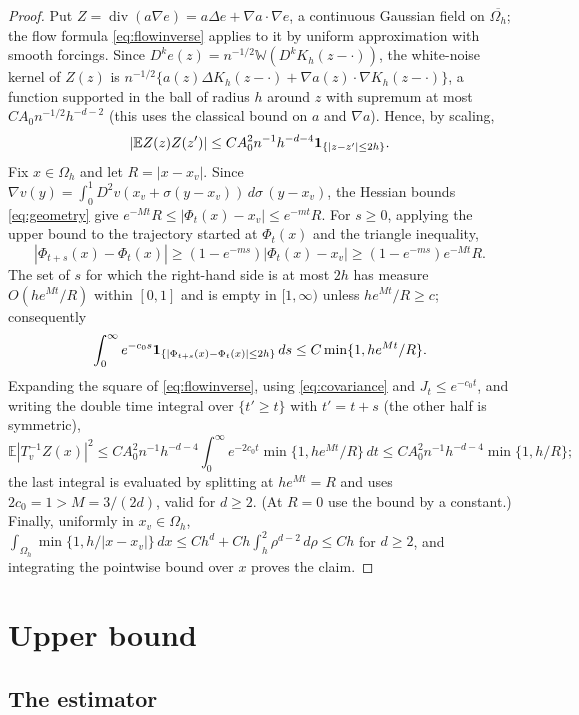 \documentclass[12pt]{article}
\numberwithin{equation}{section}
\newcommand{\E}{\mathbb E}
\newcommand{\diver}{\operatorname{div}}
\begin{document}
\begin{proof}
Put $Z=\diver(a\nabla e)=a\Delta e+\nabla a\cdot\nabla e$, a continuous
Gaussian field on $\overline{\Omega_h}$; the flow formula
\eqref{eq:flowinverse} applies to it by uniform approximation with
smooth forcings. Since $D^ke(z)=n^{-1/2}\mathbb W(D^kK_h(z-\cdot))$,
the white-noise kernel of $Z(z)$ is
$n^{-1/2}\{a(z)\Delta K_h(z-\cdot)+\nabla a(z)\cdot\nabla K_h(z-\cdot)\}$,
a function supported in the ball of radius $h$ around $z$ with supremum
at most $CA_0n^{-1/2}h^{-d-2}$ (this uses the classical bound on $a$
and $\nabla a$). Hence, by scaling,
\begin{equation}\label{eq:covariance}
 |\E Z(z)Z(z')|
 \le C A_0^2 n^{-1}h^{-d-4}{\bf1}_{\{|z-z'|\le2h\}} .
\end{equation}
Fix $x\in\Omega_h$ and let $R=|x-x_v|$. Since
$\nabla v(y)=\int_0^1D^2v(x_v+\sigma(y-x_v))\,d\sigma\,(y-x_v)$, the
Hessian bounds \eqref{eq:geometry} give
$e^{-Mt}R\le|\Phi_t(x)-x_v|\le e^{-mt}R$. For $s\ge0$, applying the
upper bound to the trajectory started at $\Phi_t(x)$ and the triangle
inequality,
\[
 |\Phi_{t+s}(x)-\Phi_t(x)|
 \ge (1-e^{-ms})|\Phi_t(x)-x_v|
 \ge (1-e^{-ms})e^{-Mt}R.
\]
The set of $s$ for which the right-hand side is at most $2h$ has
measure $O(he^{Mt}/R)$ within $[0,1]$ and is empty in $[1,\infty)$
unless $he^{Mt}/R\ge c$; consequently
\[
 \int_0^\infty e^{-c_0s}
 {\bf1}_{\{|\Phi_{t+s}(x)-\Phi_t(x)|\le2h\}}\,ds
 \le C\min\{1,he^{Mt}/R\}.
\]
Expanding the square of \eqref{eq:flowinverse}, using
\eqref{eq:covariance} and $J_t\le e^{-c_0t}$, and writing the double
time integral over $\{t'\ge t\}$ with $t'=t+s$ (the other half is
symmetric),
\[
 \E|T_v^{-1}Z(x)|^2
 \le CA_0^2n^{-1}h^{-d-4}
 \int_0^\infty e^{-2c_0t}\min\{1,he^{Mt}/R\}\,dt
 \le CA_0^2n^{-1}h^{-d-4}\min\{1,h/R\};
\]
the last integral is evaluated by splitting at $he^{Mt}=R$ and uses
$2c_0=1>M=3/(2d)$, valid for $d\ge2$. (At $R=0$ use the bound by a
constant.) Finally, uniformly in $x_v\in\Omega_h$,
$\int_{\Omega_h}\min\{1,h/|x-x_v|\}\,dx
 \le Ch^d+Ch\int_h^2\rho^{d-2}\,d\rho\le Ch$ for $d\ge2$, and
integrating the pointwise bound over $x$ proves the claim.
\end{proof}

\section{Upper bound}\label{sec:upper}

\subsection{The estimator}\label{sec:estimator}
\end{document}
